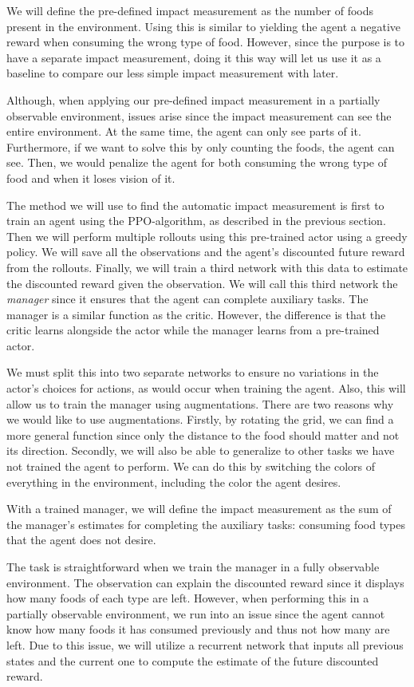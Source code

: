\documentclass[12pt,A4]{report}
\theoremstyle{definition}
\begin{document}
We will define the pre-defined impact measurement as the number of foods present in the environment. Using this is similar to yielding the agent a negative reward when consuming the wrong type of food. 
However, since the purpose is to have a separate impact measurement, doing it this way will let us use it as a baseline to compare our less simple impact measurement with later.

Although, when applying our pre-defined impact measurement in a partially observable environment, issues arise since the impact measurement can see the entire environment. At the same time, the agent can only see parts of it. Furthermore, if we want to solve this by only counting the foods, the agent can see. Then, we would penalize the agent for both consuming the wrong type of food and when it loses vision of it.

The method we will use to find the automatic impact measurement is first to train an agent using the PPO-algorithm, as described in the previous section. Then we will perform multiple rollouts using this pre-trained actor using a greedy policy. We will save all the observations and the agent's discounted future reward from the rollouts. Finally, we will train a third network with this data to estimate the discounted reward given the observation. We will call this third network the \textit{manager} since it ensures that the agent can complete auxiliary tasks. The manager is a similar function as the critic. However, the difference is that the critic learns alongside the actor while the manager learns from a pre-trained actor. 

We must split this into two separate networks to ensure no variations in the actor's choices for actions, as would occur when training the agent. Also, this will allow us to train the manager using augmentations. There are two reasons why we would like to use augmentations. Firstly, by rotating the grid, we can find a more general function since only the distance to the food should matter and not its direction. Secondly, we will also be able to generalize to other tasks we have not trained the agent to perform. We can do this by switching the colors of everything in the environment, including the color the agent desires. 

With a trained manager, we will define the impact measurement as the sum of the manager's estimates for completing the auxiliary tasks: consuming food types that the agent does not desire. 

The task is straightforward when we train the manager in a fully observable environment. The observation can explain the discounted reward since it displays how many foods of each type are left. However, when performing this in a partially observable environment, we run into an issue since the agent cannot know how many foods it has consumed previously and thus not how many are left. Due to this issue, we will utilize a recurrent network that inputs all previous states and the current one to compute the estimate of the future discounted reward. 
\end{document}

